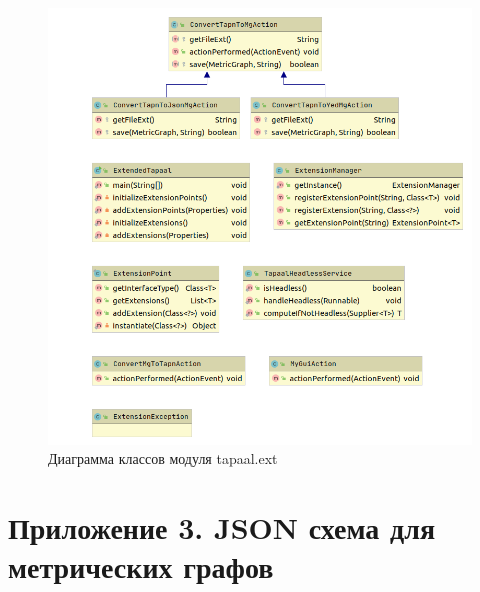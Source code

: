 \documentclass{../TechDoc}
\begin{document}
	\begin{figure}[h!]
		\centering
		\includegraphics[width=0.9\linewidth]{ext_classes}
		\caption{Диаграмма классов модуля tapaal.ext}
		\label{fig:extclasses}
	\end{figure}
	
	\section*{Приложение 3. JSON схема для метрических графов}
	
							
\end{document}
